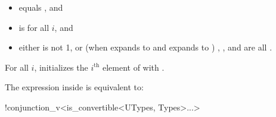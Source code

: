 \documentclass{wg21}
\begin{document}
\begin{itemdescr}
    \pnum
    \constraints
    \begin{itemize}
        \item
         equals , and

        \item
         is  for all $i$, and

        \item
        either
         is not 1, or
        (when  expands to  and  expands to )
        , ,
        and  are all .
    \end{itemize}

    \pnum
    \effects
    For all $i$,
    initializes the $i^\text{th}$ element of  with
    .

    \pnum
    \remarks
    The expression inside  is equivalent to:
    \begin{codeblock}
        !conjunction_v<is_convertible<UTypes, Types>...>
    \end{codeblock}
\end{itemdescr}
\end{document}

